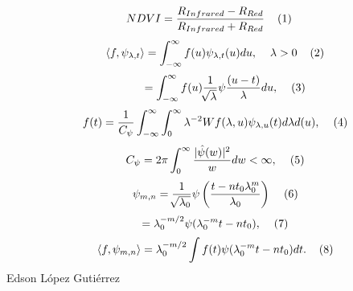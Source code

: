 \documentclass{article}
\begin{document}
$$NDVI=\frac{R_{Infrared}-R_{Red}}{R_{Infrared}+R_{Red}}\hspace{4mm}(1)$$
$$\hspace{4mm}\langle f,\psi_{\lambda,t}\rangle=\int_{-\infty}^{\infty}f(u)\psi_{\lambda,t}(u)du,\hspace{4mm}\lambda>0\hspace{4mm}(2)$$
$$\hspace{10mm}=\int_{-\infty}^{\infty}f(u)\frac{1}{\sqrt[]{\lambda}}\psi\frac{(u-t)}{\lambda}du,\hspace{4mm}(3)$$
$$\hspace{4mm}f(t)=\frac{1}{C_{\psi}}\int_{-\infty}^{\infty}\int_{0}^{\infty}\lambda^{-2}Wf(\lambda,u)\psi_{\lambda,u}(t)d\lambda d(u),\hspace{4mm}(4)$$
$$\hspace{4mm}C_\psi=2\pi\int_{0}^{\infty}\frac{|\hat{\psi}(w)|^{2}}{w}dw<\infty,\hspace{4mm}(5)$$
$$\hspace{4mm}\psi_{m,n}=\frac{1}{\sqrt[]{\lambda_{0}}}\psi\left(\frac{t-nt_{0}\lambda_{0}^{m}}{\lambda_{0}}\right)\hspace{4mm}(6)$$
$$\hspace{4mm}=\lambda_{0}^{-m/2}\psi(\lambda_{0}^{-m}t-nt_{0}),\hspace{4mm}(7)$$
$$\hspace{4mm}\langle f,\psi_{m,n}\rangle=\lambda_{0}^{-m/2}\int f(t)\psi(\lambda_{0}^{-m}t-nt_{0})dt.\hspace{4mm}(8)$$
\vspace{2cm}
Edson López Gutiérrez
\end{document}
